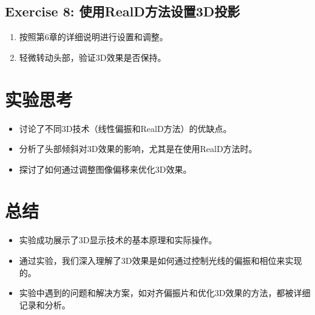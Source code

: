 \documentclass{ctexart}
\begin{document}
\subsection{Exercise 8: 使用RealD方法设置3D投影}
\begin{enumerate}
    \item 按照第6章的详细说明进行设置和调整。
    \item 轻微转动头部，验证3D效果是否保持。
\end{enumerate}

\section{实验思考}
\begin{itemize}
    \item 讨论了不同3D技术（线性偏振和RealD方法）的优缺点。
    \item 分析了头部倾斜对3D效果的影响，尤其是在使用RealD方法时。
    \item 探讨了如何通过调整图像偏移来优化3D效果。
\end{itemize}

\section{总结}
\begin{itemize}
    \item 实验成功展示了3D显示技术的基本原理和实际操作。
    \item 通过实验，我们深入理解了3D效果是如何通过控制光线的偏振和相位来实现的。
    \item 实验中遇到的问题和解决方案，如对齐偏振片和优化3D效果的方法，都被详细记录和分析。
\end{itemize}
\end{document}
